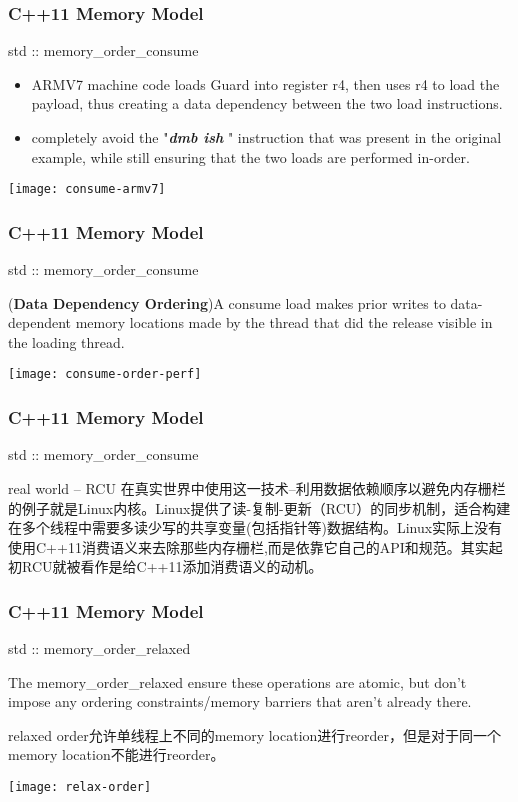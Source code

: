 \begin{frame}
    \frametitle{C++11 Memory Model}
    \LARGE
    std :: memory\_order\_consume
    
    
    \large
    \begin{itemize}
        \item ARMV7 machine code loads Guard into register r4, then uses r4 to load the payload, thus creating a data dependency between the two load instructions.  
        \item completely avoid the "\textbf{\textit{dmb ish }}" instruction that was present in the original example, while still ensuring that the two loads are performed in-order.
    \end{itemize}
    
    \texttt{[image: consume-armv7]}
\end{frame}
\begin{frame}
    \frametitle{C++11 Memory Model}
    \LARGE
    std :: memory\_order\_consume
    
    
    \normalsize
    (\textbf{Data Dependency Ordering})A consume load makes prior writes to data-dependent memory
    locations made by the thread that did the release visible in the
    loading thread.
    
    \texttt{[image: consume-order-perf]}
\end{frame}

\begin{frame}
    \frametitle{C++11 Memory Model}
    \LARGE
    std :: memory\_order\_consume
   
   \normalsize
   \begin{block}{real world -- RCU}
    在真实世界中使用这一技术--利用数据依赖顺序以避免内存栅栏的例子就是Linux内核。Linux提供了读-复制-更新（RCU）的同步机制，适合构建在多个线程中需要多读少写的共享变量(包括指针等)数据结构。Linux实际上没有使用C++11消费语义来去除那些内存栅栏,而是依靠它自己的API和规范。其实起初RCU就被看作是给C++11添加消费语义的动机。  
    \end{block} 
 
\end{frame}
\begin{frame}
    \frametitle{C++11 Memory Model}
    \LARGE
    std :: memory\_order\_relaxed
    
    
    \normalsize
   The memory\_order\_relaxed ensure these operations are atomic, but don’t impose any ordering constraints/memory barriers that aren’t already there.
   
    relaxed order允许单线程上不同的memory location进行reorder，但是对于同一个memory location不能进行reorder。
    
    \centering
    \texttt{[image: relax-order]}
\end{frame}


